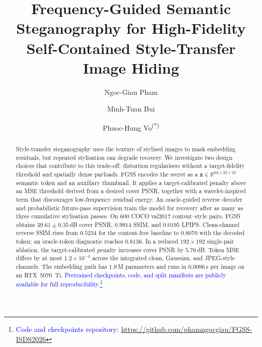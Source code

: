 \documentclass[runningheads]{llncs}
\newcommand{\revised}[1]{\textcolor{blue}{#1}}
\begin{document}
\title{Frequency-Guided Semantic Steganography for High-Fidelity Self-Contained Style-Transfer Image Hiding}


\author{%
Ngoc-Giau Pham \and
Minh-Tuan Bui \and
Phuoc-Hung Vo\textsuperscript{(\textrm{*})}%
}



\maketitle

\begin{abstract}
Style-transfer steganography uses the texture of stylised images to mask embedding residuals, but repeated stylisation can degrade recovery. We investigate two design choices that contribute to this trade-off: distortion regularisers without a target-fidelity threshold and spatially dense payloads. FGSS encodes the secret as a $\mathbf{z}\!\in\!\mathbb{R}^{64\times32\times32}$ semantic token and an auxiliary thumbnail. It applies a target-calibrated penalty above an MSE threshold derived from a desired cover PSNR, together with a wavelet-inspired term that discourages low-frequency residual energy. An oracle-guided reverse decoder and probabilistic future-pass supervision train the model for recovery after as many as three cumulative stylisation passes. On $600$ COCO val2017 content--style pairs, FGSS obtains $39.61\pm0.35$\,dB cover PSNR, $0.9914$ SSIM, and $0.0195$ LPIPS. Clean-channel reverse SSIM rises from $0.5234$ for the content-free baseline to $0.8070$ with the decoded token; an oracle-token diagnostic reaches $0.8136$. In a reduced $192\!\times\!192$ single-pair ablation, the target-calibrated penalty increases cover PSNR by $5.76$\,dB. Token MSE differs by at most $1.2\!\times\!10^{-4}$ across the integrated clean, Gaussian, and JPEG-style channels. The embedding path has $1.9$\,M parameters and runs in $0.0096$\,s per image on an RTX~5070~Ti. \revised{Pretrained checkpoints, code, and split manifests are publicly available for full reproducibility.\footnote{\revised{Code and checkpoints repository: \url{https://github.com/phamngocgiau/FGSS-ISDS2026}}}}

\end{abstract}
\end{document}

